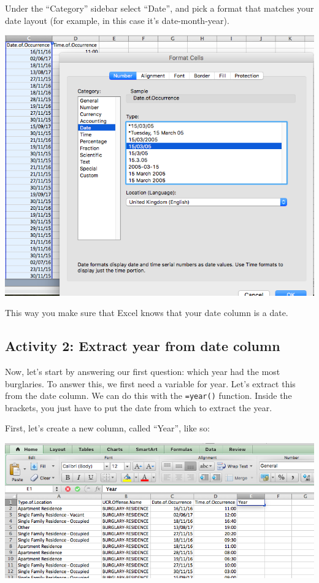 \documentclass[]{book}
\theoremstyle{definition}
\theoremstyle{definition}
\theoremstyle{definition}
\theoremstyle{remark}
\begin{document}
Under the ``Category'' sidebar select ``Date'', and pick a format that
matches your date layout (for example, in this case it's
date-month-year).

\includegraphics{imgs/format_date_2.png}

This way you make sure that Excel knows that your date column is a date.

\hypertarget{activity-2-extract-year-from-date-column}{%
\subsection{Activity 2: Extract year from date
column}\label{activity-2-extract-year-from-date-column}}

 Now, let's start by answering our first question: which year had the
most burglaries. To answer this, we first need a variable for year.
Let's extract this from the date column. We can do this with the
\texttt{=year()} function. Inside the brackets, you just have to put the
date from which to extract the year.

First, let's create a new column, called ``Year'', like so:

\includegraphics{imgs/create_year_col.png}
\end{document}
